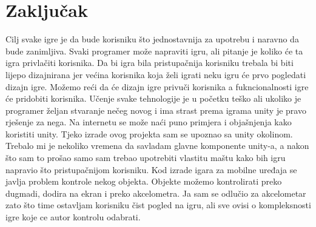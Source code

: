 \section{Zaključak}
Cilj svake igre je da bude korisniku što jednostavnija za upotrebu i naravno da bude zanimljiva. Svaki programer može napraviti igru, ali pitanje je koliko će ta igra privlačiti korisnika. Da bi igra bila pristupačnija korisniku trebala bi biti lijepo dizajnirana jer većina korisnika koja želi igrati neku igru će prvo pogledati dizajn igre. Možemo reći da će dizajn igre privuči korisnika a fukncionalnosti igre će pridobiti korisnika. Učenje svake tehnologije je u početku teško ali ukoliko je programer željan stvaranje nečeg novog i ima strast prema igrama unity je pravo rješenje za nega. Na internetu se može naći puno primjera i objašnjenja kako koristiti unity. Tjeko izrade ovog projekta sam se upoznao sa unity okolinom. Trebalo mi je nekoliko vremena da savladam glavne komponente unity-a, a nakon što sam to prošao samo sam trebao upotrebiti vlastitu maštu kako bih igru napravio što pristupačnijom korisniku. Kod izrade igara za mobilne uređaja se javlja problem kontrole nekog objekta. Objekte možemo kontrolirati preko dugmadi, dodira na ekran i preko akcelometra. Ja sam se odlučio za akcelometar zato što time ostavljam korisniku čist pogled na igru, ali sve ovisi o kompleksnosti igre koje ce autor kontrolu odabrati. 